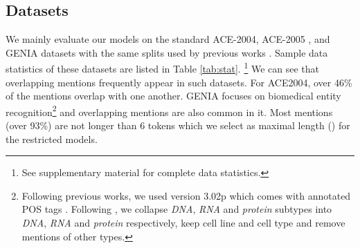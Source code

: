 \documentclass[11pt,a4paper]{article}
\theoremstyle{theorem}
\begin{document}
\subsection{Datasets}




We mainly evaluate our models on the standard ACE-2004, ACE-2005 \cite{doddington2004automatic}, and GENIA \cite{kim2003genia} datasets  with the same splits used by previous works \cite{lu2015joint,muis2017labeling}.
Sample data statistics of these  datasets are listed in Table \ref{tab:stat}. 
\footnote{See supplementary material for complete data statistics.}
We can see that overlapping mentions frequently appear in such datasets. 
{\color{black} 
For ACE2004, over 46\% of the mentions overlap with one another.
GENIA focuses on biomedical entity recognition\footnote{Following previous works, we used version 3.02p which comes with annotated POS tags \cite{tateisi2004part} .
Following  \cite{finkel2009nested}, we collapse \textit{DNA}, \textit{RNA} and \textit{protein} subtypes into \textit{DNA}, \textit{RNA} and \textit{protein} respectively, keep cell line and cell type and remove  mentions of other types.}
and overlapping mentions are also common in it.
Most mentions (over 93\%) are not longer than 6 tokens which we select as  maximal length () for the restricted models.}
\end{document}
